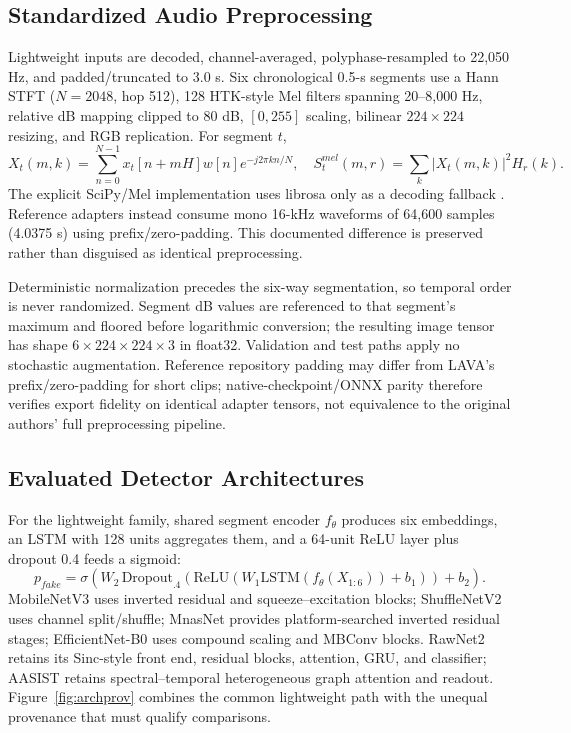\documentclass[10pt,journal,onecolumn,a4paper]{IEEEtran}
\begin{document}
\subsection{Standardized Audio Preprocessing}
Lightweight inputs are decoded, channel-averaged, polyphase-resampled to 22,050 Hz, and padded/truncated to 3.0 s. Six chronological 0.5-s segments use a Hann STFT ($N=2048$, hop 512), 128 HTK-style Mel filters spanning 20--8,000 Hz, relative dB mapping clipped to 80 dB, $[0,255]$ scaling, bilinear $224\times224$ resizing, and RGB replication. For segment $t$,
\begin{equation}
X_t(m,k)=\sum_{n=0}^{N-1}x_t[n+mH]w[n]e^{-j2\pi kn/N},\quad S_{t}^{mel}(m,r)=\sum_k|X_t(m,k)|^2H_r(k).
\label{eq:mel}
\end{equation}
The explicit SciPy/Mel implementation uses librosa only as a decoding fallback \cite{mcfee2015librosa}. Reference adapters instead consume mono 16-kHz waveforms of 64,600 samples (4.0375 s) using prefix/zero-padding. This documented difference is preserved rather than disguised as identical preprocessing.

Deterministic normalization precedes the six-way segmentation, so temporal order is never randomized. Segment dB values are referenced to that segment's maximum and floored before logarithmic conversion; the resulting image tensor has shape $6\times224\times224\times3$ in float32. Validation and test paths apply no stochastic augmentation. Reference repository padding may differ from LAVA's prefix/zero-padding for short clips; native-checkpoint/ONNX parity therefore verifies export fidelity on identical adapter tensors, not equivalence to the original authors' full preprocessing pipeline.

\subsection{Evaluated Detector Architectures}
For the lightweight family, shared segment encoder $f_\theta$ produces six embeddings, an LSTM with 128 units aggregates them, and a 64-unit ReLU layer plus dropout 0.4 feeds a sigmoid:
\begin{equation}
p_{fake}=\sigma\!\left(W_2\,\mathrm{Dropout}_{.4}\!\left(\mathrm{ReLU}(W_1\mathrm{LSTM}(f_\theta(X_{1:6}))+b_1)\right)+b_2\right).
\label{eq:head}
\end{equation}
MobileNetV3 uses inverted residual and squeeze--excitation blocks; ShuffleNetV2 uses channel split/shuffle; MnasNet provides platform-searched inverted residual stages; EfficientNet-B0 uses compound scaling and MBConv blocks. RawNet2 retains its Sinc-style front end, residual blocks, attention, GRU, and classifier; AASIST retains spectral--temporal heterogeneous graph attention and readout. Figure~\ref{fig:archprov} combines the common lightweight path with the unequal provenance that must qualify comparisons.
\end{document}
